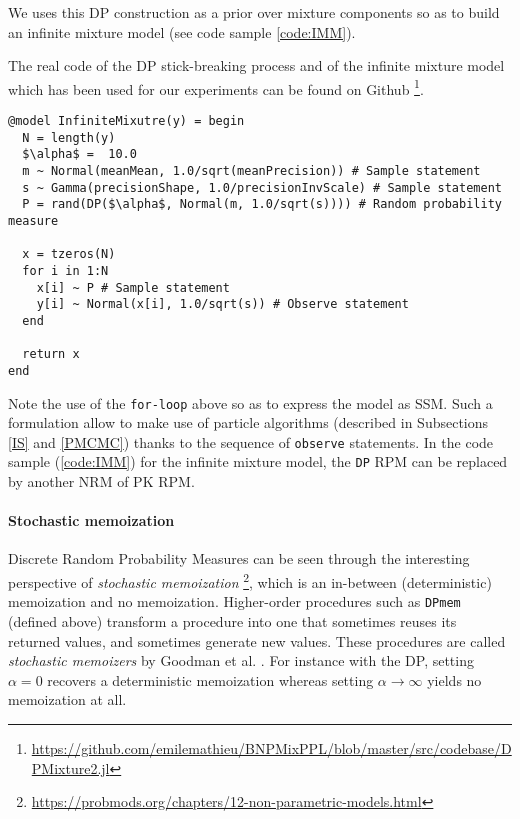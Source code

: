 We uses this \gls{DP} construction as a prior over mixture components so as to build an infinite mixture model (see code sample \ref{code:IMM}).

The real code of the \gls{DP} stick-breaking process and of the infinite mixture model which has been used for our experiments can be found on Github \footnote{\url{https://github.com/emilemathieu/BNPMixPPL/blob/master/src/codebase/DPMixture2.jl}}.

\begin{lstlisting}[caption={Nonconjugate infinite mixture model written in Turing.jl.},captionpos=b,label=code:IMM]
@model InfiniteMixutre(y) = begin
  N = length(y)
  $\alpha$ =  10.0
  m ~ Normal(meanMean, 1.0/sqrt(meanPrecision)) # Sample statement
  s ~ Gamma(precisionShape, 1.0/precisionInvScale) # Sample statement
  P = rand(DP($\alpha$, Normal(m, 1.0/sqrt(s)))) # Random probability measure

  x = tzeros(N)
  for i in 1:N
    x[i] ~ P # Sample statement
    y[i] ~ Normal(x[i], 1.0/sqrt(s)) # Observe statement
  end

  return x
end
\end{lstlisting}

Note the use of the \texttt{for-loop} above so as to express the model as \acrlong{SSM}. Such a formulation allow to make use of particle algorithms (described in Subsections \ref{IS} and \ref{PMCMC}) thanks to the sequence of \texttt{observe} statements.
In the code sample (\ref{code:IMM}) for the infinite mixture model, the \texttt{DP} \acrlong{RPM} can be replaced by another \acrlong{NRM} of \acrlong{PK} \gls{RPM}.


\paragraph{Stochastic memoization}
Discrete Random Probability Measures can be seen through the interesting perspective of \textit{stochastic memoization} \footnote{\url{https://probmods.org/chapters/12-non-parametric-models.html}}, which is an in-between (deterministic) memoization and no memoization.
Higher-order procedures such as \texttt{DPmem} (defined above) transform a procedure into one that sometimes reuses its returned values, and sometimes generate new values. These procedures are called \textit{stochastic memoizers} by Goodman et al. \cite{Goodman:2012uq}.
For instance with the \gls{DP}, setting $\alpha = 0$ recovers a deterministic memoization whereas setting $\alpha \rightarrow \infty$ yields no memoization at all.

